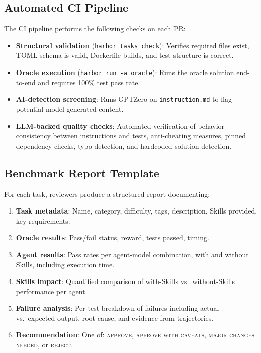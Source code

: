 \subsection{Automated CI Pipeline}

The CI pipeline performs the following checks on each PR:
\begin{itemize}[nosep]
\item \textbf{Structural validation} (\texttt{harbor tasks check}): Verifies required files exist, TOML schema is valid, Dockerfile builds, and test structure is correct.
\item \textbf{Oracle execution} (\texttt{harbor run -a oracle}): Runs the oracle solution end-to-end and requires 100\% test pass rate.
\item \textbf{AI-detection screening}: Runs GPTZero on \texttt{instruction.md} to flag potential model-generated content.
\item \textbf{LLM-backed quality checks}: Automated verification of behavior consistency between instructions and tests, anti-cheating measures, pinned dependency checks, typo detection, and hardcoded solution detection.
\end{itemize}

\subsection{Benchmark Report Template}

For each task, reviewers produce a structured report documenting:
\begin{enumerate}[nosep]
\item \textbf{Task metadata}: Name, category, difficulty, tags, description, Skills provided, key requirements.
\item \textbf{Oracle results}: Pass/fail status, reward, tests passed, timing.
\item \textbf{Agent results}: Pass rates per agent-model combination, with and without Skills, including execution time.
\item \textbf{Skills impact}: Quantified comparison of with-Skills vs.\ without-Skills performance per agent.
\item \textbf{Failure analysis}: Per-test breakdown of failures including actual vs.\ expected output, root cause, and evidence from trajectories.
\item \textbf{Recommendation}: One of: \textsc{approve}, \textsc{approve with caveats}, \textsc{major changes needed}, or \textsc{reject}.
\end{enumerate}

